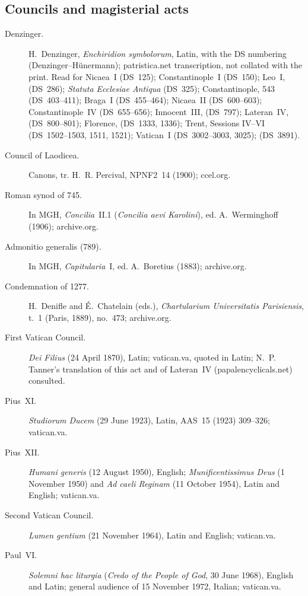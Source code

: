 \subsection*{Councils and magisterial acts}
\begin{description}
\item[Denzinger.] H.~Denzinger, \emph{Enchiridion symbolorum}, Latin, with
  the DS numbering (Denzinger--Hünermann); patristica.net transcription,
  not collated with the print. Read for Nicaea~I (DS~125); Constantinople~I
  (DS~150); Leo~I,  (DS~286); \emph{Statuta
  Ecclesiae Antiqua} (DS~325); Constantinople, 543 (DS~403--411); Braga~I
  (DS~455--464); Nicaea~II (DS~600--603); Constantinople~IV (DS~655--656);
  Innocent~III,  (DS~797); Lateran~IV, 
  (DS~800--801); Florence,  (DS~1333, 1336); Trent,
  Sessions IV--VI (DS~1502--1503, 1511, 1521); Vatican~I (DS~3002--3003,
  3025);  (DS~3891).
\item[Council of Laodicea.] Canons, tr. H.~R. Percival, NPNF2~14 (1900);
  ccel.org.
\item[Roman synod of 745.] In MGH, \emph{Concilia}~II.1 (\emph{Concilia
  aevi Karolini}), ed. A.~Werminghoff (1906); archive.org.
\item[Admonitio generalis (789).] In MGH, \emph{Capitularia}~I, ed.
  A.~Boretius (1883); archive.org.
\item[Condemnation of 1277.] H.~Denifle and É.~Chatelain (eds.),
  \emph{Chartularium Universitatis Parisiensis}, t.~1 (Paris, 1889),
  no.~473; archive.org.
\item[First Vatican Council.] \emph{Dei Filius} (24 April 1870), Latin;
  vatican.va, quoted in Latin; N.~P. Tanner's translation of this act and
  of Lateran~IV (papalencyclicals.net) consulted.
\item[Pius~XI.] \emph{Studiorum Ducem} (29 June 1923), Latin, AAS~15
  (1923) 309--326; vatican.va.
\item[Pius~XII.] \emph{Humani generis} (12 August 1950), English;
  \emph{Munificentissimus Deus} (1 November 1950) and \emph{Ad caeli
  Reginam} (11 October 1954), Latin and English; vatican.va.
\item[Second Vatican Council.] \emph{Lumen gentium} (21 November 1964),
  Latin and English; vatican.va.
\item[Paul~VI.] \emph{Solemni hac liturgia} (\emph{Credo of the People of
  God}, 30 June 1968), English and Latin; general audience of 15 November
  1972, Italian; vatican.va.

\end{description}
